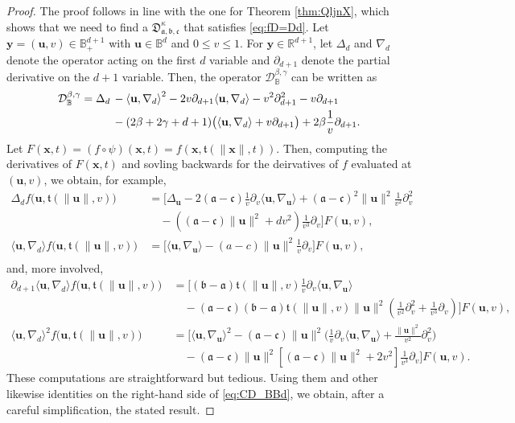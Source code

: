 \documentclass{amsart}
\theoremstyle{remark}
\def\la{{\langle}}
\def\ra{{\rangle}}
\def\fa{{\mathfrak a}}
\def\fb{{\mathfrak b}}
\def\fc{{\mathfrak c}}
\def\ft{{\mathfrak t}}
\def\fD{{\mathfrak D}}
\def\b{{\beta}}
\def\g{{\gamma}}
\def\k{{\kappa}}
\def\la{{\langle}}
\def\ra{{\rangle}}
\def\ub{{\mathbf u}}
\def\xb{{\mathbf x}}
\def\yb{{\mathbf y}}
\def\CD{{\mathcal D}}
\def\BB{{\mathbb B}}
\def\RR{{\mathbb R}}
\begin{document}
\begin{proof}
The proof follows in line with the one for Theorem \ref{thm:QljnX}, which shows that we need to find a 
$\fD_{\fa,\fb,\fc}^\k$ that satisfies \eqref{eq:fD=Dd}. Let $\yb = (\ub, v) \in \BB_+^{d+1}$ with $\ub \in \BB^d$ and
$0\le v\le 1$. For $\yb \in \RR^{d+1}$, let $\Delta_d$ and $\nabla_d$ denote the operator acting on the first $d$ variable
and $\partial_{d+1}$ denote the partial derivative on the $d+1$ variable. Then, the operator $\CD_\BB^{\b,\g}$ can 
be written as 
\begin{align}\label{eq:CD_BBd}
\CD_\BB^{\b,\g} =  \Delta_d \, & - \la \ub, \nabla_d \ra^2 -2 v \partial_{d+1}  \la \ub, \nabla_d\ra
 - v^2 \partial_{d+1}^2 - v \partial_{d+1}\\
  & - (2 \beta +2 \gamma +d+1) \big( \la \ub, \nabla_d\ra + v \partial_{d+1}\big) + 2 \beta \frac1{v} \partial_{d+1}.  \notag
\end{align}
Let $F(\xb,t) = (f\circ \psi)(\xb,t) = f(\xb, \ft(\|\xb\|,t))$.  
Then, computing the derivatives of $F(\xb,t)$ and sovling backwards for the deirvatives of $f$ evaluated at $(\ub,v)$, 
we obtain, for example, 
\begin{align*}
  \Delta_d f\big(\ub, \ft(\|\ub\|, v)\big) \,& =  \Big [ \Delta_\ub - 2 (\fa-\fc)\frac1 v \partial_v \la \ub, \nabla_\ub \ra
  + (\fa-\fc)^2\|\ub\|^2 \frac{1}{v^2} \partial_v^2 \\
 \, & \quad  - \left ((\fa - \fc)\|\ub\|^2 + d v^2\right)\frac1 {v^3}  \partial_v \Big] F(\ub,v),  \\
 \la \ub, \nabla_d \ra f\big(\ub, \ft(\|\ub\|, v)\big) \,& = \Big [ \la \ub, \nabla_\ub\ra   -(a-c) \|\ub\|^2\frac{1}{v} \partial_v \Big]F(\ub,v), \\
\end{align*}
and, more involved,  
\begin{align*} 
  \partial_{d+1} \la \ub, \nabla_d\ra f\big(\ub, \ft(\|\ub\|, v)\big)
  \,&  = \bigg[ (\fb-\fa) \ft(\|\ub\|, v)\frac1 v \partial_v \la \ub, \nabla_\ub \ra  \\
      & \quad  - (\fa-\fc)(\fb-\fa) \ft(\|\ub\|, v) \|\ub\|^2 \left( \frac{1}{v^2} \partial_v^2 +\frac{1}{v^3} \partial_v \right) \bigg] F(\ub,v), \\
  \la \ub, \nabla_d \ra^2 f\big(\ub, \ft(\|\ub\|, v)\big) \,& =  \bigg[ \la \ub, \nabla_\ub \ra^2   
  - (\fa-\fc)\|\ub\|^2 \Big( \frac1 v \partial_v \la \ub, \nabla_\ub \ra +  \frac{\|\ub\|^2}{v^2} \partial_v^2 \Big) \\
  & \quad  -  (\fa-\fc)\|\ub\|^2 \left [ (\fa - \fc)\|\ub\|^2 + 2 v^2\right ]
   \frac1 {v^3}  \partial_v  \bigg] F(\ub,v).
\end{align*}
These computations are straightforward but tedious. Using them and other likewise identities on the right-hand side of \eqref{eq:CD_BBd}, we obtain, after a careful simplification, the stated result.
\end{proof} 
\end{document}
